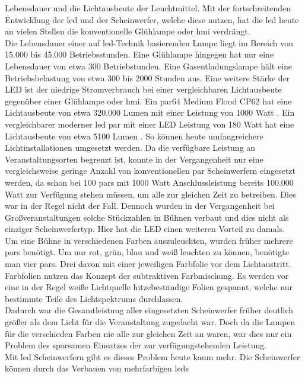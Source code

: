 \documentclass[11pt]{scrartcl}
\begin{document}
Lebensdauer und die Lichtausbeute der Leuchtmittel. Mit der fortschreitenden Entwicklung der \ac{led} und der
Scheinwerfer, welche diese nutzen, hat die \ac{led} heute an vielen Stellen die konventionelle Glühlampe oder \ac{hmi} verdrängt.\\
Die Lebensdauer einer auf \ac{led}-Technik basierenden Lampe liegt im Bereich von 15.000 bis 45.000 Betriebsstunden. Eine Glühlampe hingegen
hat nur eine Lebensdauer von etwa 300 Betriebstunden. Eine Gasentladungslampe hält eine Betriebsbelastung von etwa 300 bis 2000 Stunden aus.
Eine weitere Stärke der LED ist der niedrige Stromverbrauch bei einer vergleichbaren Lichtausbeute gegenüber einer Glühlampe oder \ac{hmi}.
Ein \ac{par}64 Medium Flood CP62 hat eine Lichtausbeute von etwa 320.000 Lumen mit einer Leistung von 1000 Watt \cite{convpar}. Ein %
vergleichbarer moderner \ac{led} \ac{par} mit einer LED Leistung von 180 Watt hat eine Lichtausbeute von etwa 5100 Lumen \cite{ledpar}. So
können heute umfangreichere Lichtinstallationen umgesetzt werden. Da die verfügbare Leistung an Veranstaltungsorten begrenzt ist, konnte in
der Vergangenheit nur eine vergleichsweise geringe Anzahl von konventionellen \ac{par} Scheinwerfern eingesetzt werden, da schon bei 100
\ac{par}s mit 1000 Watt Anschlussleistung bereits 100.000 Watt zur Verfügung stehen müssen, um alle zur gleichen Zeit zu betreiben. Dies
war in der Regel nicht der Fall. Dennoch wurden in der Vergangenheit bei Großveranstaltungen solche Stückzahlen in Bühnen verbaut und dies
nicht als einziger Scheinwerfertyp. Hier hat die LED einen weiteren Vorteil zu damals.\\
Um eine Bühne in verschiedenen Farben auszuleuchten, wurden früher mehrere \ac{par}s benötigt. Um nur rot, grün, blau und weiß leuchten zu
können, benötigte man vier \ac{par}s. Drei davon mit einer jeweiligen Farbfolie vor dem Lichtaustritt. Farbfolien nutzen das Konzept der
subtraktiven Farbmischung. Es werden vor eine in der Regel weiße Lichtquelle hitzebeständige Folien gespannt, welche nur bestimmte Teile
des  Lichtspektrums durchlassen.\\
Dadurch war die Gesamtleistung aller eingesetzten Scheinwerfer früher deutlich größer als dem Licht für die Veranstaltung zugedacht war.
Doch da die Lampen für die verschieden Farben nie alle zur gleichen Zeit an waren, war dies nur ein Problem des sparsamen Einsatzes der zur
verfügungstehenden Leistung.\\
Mit \ac{led} Scheinwerfern gibt es dieses Problem heute kaum mehr. Die Scheinwerfer können durch das Verbauen von mehrfarbigen \ac{led}s
\end{document}
